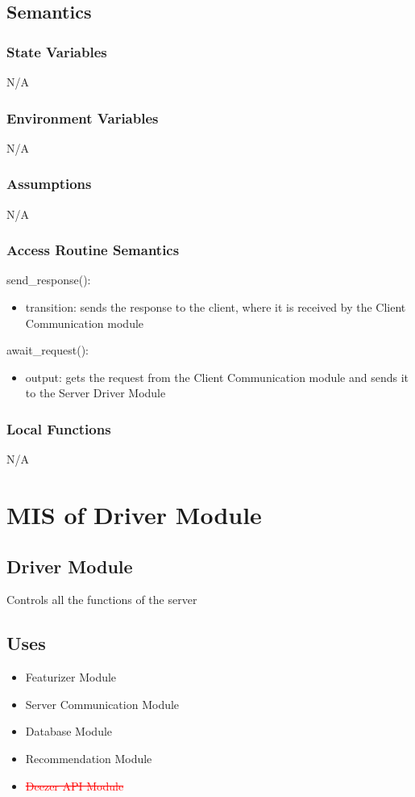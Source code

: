 \documentclass[12pt, titlepage]{article}
\begin{document}
\subsection{Semantics}

\subsubsection{State Variables}
N/A

\subsubsection{Environment Variables}
N/A

\subsubsection{Assumptions}
N/A

\subsubsection{Access Routine Semantics}

\noindent send\_response():
\begin{itemize}
\item transition: sends the response to the client, where it is received by the Client Communication module 
\end{itemize}
\noindent await\_request():
\begin{itemize} 
  \item output: gets the request from the Client Communication module and sends it to the Server Driver Module  
\end{itemize}

\subsubsection{Local Functions}
N/A

\section{MIS of Driver Module} 

\subsection{Driver Module}
Controls all the functions of the server
\subsection{Uses}
\begin{itemize}
  \item Featurizer Module
  \item Server Communication Module
  \item Database Module
  \item Recommendation Module
  \item \textcolor{red}{\sout{Deezer API Module}}
\end{itemize}
\end{document}
